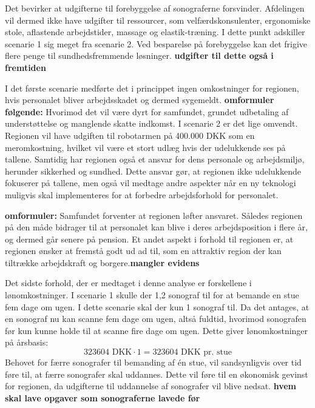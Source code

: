 Det bevirker at udgifterne til forebyggelse af sonograferne forsvinder. Afdelingen vil dermed ikke have udgifter til ressourcer, som velfærdskonsulenter, ergonomiske stole, aflastende arbejdstider, massage og elastik-træning. I dette punkt adskiller scenarie 1 sig meget fra scenarie 2. Ved besparelse på forebyggelse kan det frigive flere penge til sundhedsfremmende løsninger. \textbf{udgifter til dette også i fremtiden}

I det første scenarie medførte det i princippet ingen omkostninger for regionen, hvis personalet bliver arbejdsskadet og dermed sygemeldt. \textbf{omformuler følgende: }Hvorimod det vil være dyrt for samfundet, grundet udbetaling af understøttelse og manglende skatte indkomst. I scenarie 2 er det lige omvendt. Regionen vil have udgiften til robotarmen på 400.000 DKK som en meromkostning, hvilket vil være et stort udlæg hvis der udelukkende ses på tallene. Samtidig har regionen også et ansvar for dens personale og arbejdsmiljø, herunder sikkerhed og sundhed. Dette ansvar gør, at regionen ikke udelukkende fokuserer på tallene, men også vil medtage andre aspekter når en ny teknologi muligvis skal implementeres for at forbedre arbejdsforhold for personalet. 

\textbf{omformuler: }Samfundet forventer at regionen løfter ansvaret. Således regionen på den måde bidrager til at personalet kan blive i deres arbejdsposition i flere år, og dermed går senere på pension. Et andet aspekt i forhold til regionen er, at regionen ønsker at fremstå godt ud ad til, som en attraktiv region der kan tiltrække arbejdskraft og borgere.\textbf{mangler evidens} 

Det sidste forhold, der er medtaget i denne analyse er forskellene i lønomkostninger. I scenarie 1 skulle der 1,2 sonograf til for at bemande en stue fem dage om ugen. I dette scenarie skal der kun 1 sonograf til. Da det antages, at en sonograf nu kan scanne fem dage om ugen, altså fuldtid, hvorimod sonografen før kun kunne holde til at scanne fire dage om ugen. Dette giver lønomkostninger på årsbasis:
\begin{equation}
323604 \text{ DKK}\cdot1 = 323604 \text{ DKK pr. stue}
\end{equation}
Behovet for færre sonografer til bemanding af én stue, vil sandsynligvis over tid føre til, at færre sonografer skal uddannes. Dette vil føre til en økonomisk gevinst for regionen, da udgifterne til uddannelse af sonografer vil blive nedsat. \textbf{hvem skal lave opgaver som sonograferne lavede før}


